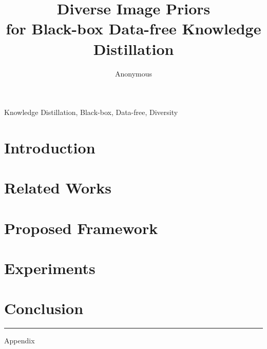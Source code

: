 \documentclass[conference]{IEEEtran}
\title{Diverse Image Priors \\ for Black-box Data-free Knowledge Distillation}
\author{Anonymous}
\begin{document}
\maketitle

\begin{abstract} \label{sec:00-abstract}
    
\end{abstract}

\begin{IEEEkeywords}
    Knowledge Distillation, Black-box, Data-free, Diversity
\end{IEEEkeywords}


\section{Introduction} \label{sec:01-introduction}


\section{Related Works} \label{sec:02-related}


\section{Proposed Framework} \label{sec:03-framework}


\section{Experiments} \label{sec:04-experiments}


\section{Conclusion} \label{sec:05-conclusion}


 \label{sec:bibliography}



\noindent\rule{\linewidth}{0.4pt}
{\Large \centering Appendix\par}
\vspace{0.5\baselineskip}

\end{document}
